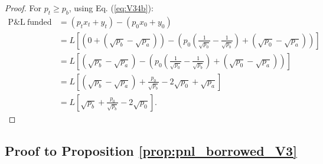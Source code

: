 \documentclass[pdftex,11pt,a4paper] {article}
\begin{document}
\begin{proof}
For $p_{t}  \geq  p_{b}$, using Eq. (\ref{eq:V34b}):
\begin{equation} \label{eq:V36b}
\begin{split}
\mathrm{P\&L \ funded} & = \left(p_{t} x_{t} + y_{t} \right) - \left(p_{0} x_{0} + y_{0}\right)\\
& = L\left[ \left(0 + \left(\sqrt{p_{b}} - \sqrt{p_{a}}\right) \right) - \left(p_{0} \left(\frac{1}{\sqrt{p_{0}}} - \frac{1}{\sqrt{p_{b}}}\right)  + \left(\sqrt{p_{0}} - \sqrt{p_{a}}\right)\right)\right]\\
& = L\left[\left(\sqrt{p_{b}} - \sqrt{p_{a}}\right) - \left(p_{0} \left(\frac{1}{\sqrt{p_{0}}} - \frac{1}{\sqrt{p_{b}}}\right)  + \left(\sqrt{p_{0}} - \sqrt{p_{a}}\right)\right)\right]\\
& = L\left[\left(\sqrt{p_{b}} - \sqrt{p_{a}}\right) + \frac{p_{0}}{\sqrt{p_{b}}}  - 2\sqrt{p_{0}} + \sqrt{p_{a}}\right]\\
& = L\left[ \sqrt{p_{b}}  + \frac{p_{0}}{\sqrt{p_{b}}}  - 2\sqrt{p_{0}} \right].
\end{split}
\end{equation}

\end{proof}

\subsection{Proof to Proposition \protect\ref{prop:pnl_borrowed_V3}}

\label{ap_prop:pnl_borrowed_V3}
\end{document}
